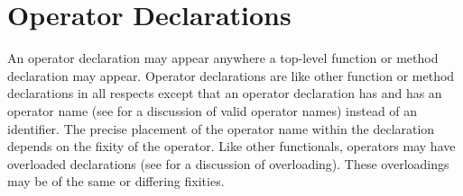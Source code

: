 %
%
%
%

\chapter{Operator Declarations}


An operator declaration may appear anywhere a top-level function or
method declaration may appear.  Operator declarations are like other
function or method declarations in all respects except that an
operator declaration has  and has
an operator name (see  for a discussion of
valid operator names) instead of an identifier.  The precise placement
of the operator name within the declaration depends on the fixity of
the operator.  Like other functionals, operators may have overloaded
declarations (see  for a discussion of
overloading).  These overloadings may be of the same or differing
fixities.

